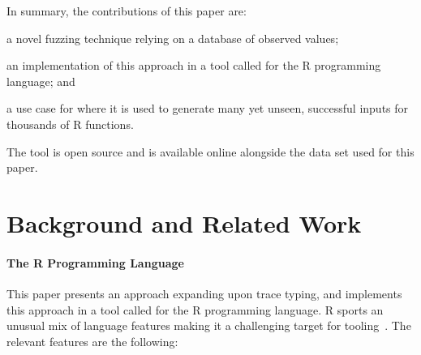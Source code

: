 \documentclass[sigplan,anonymous,review]{acmart}
\begin{document}
In summary, the contributions of this paper are:
%
\begin{inparaenum}[(1)]
    \item a novel fuzzing technique relying on a database of observed values;
    \item an implementation of this approach in a tool called \tool for the R programming language; and
    \item a use case for \tool where it is used to generate many yet unseen, successful inputs for thousands of R functions.
\end{inparaenum} 

The tool is open source and is available online alongside the data set used for this paper.

\section{Background and Related Work}
\label{sec:background}

\paragraph{The R Programming Language}

This paper presents an approach expanding upon trace typing, and implements this approach in a tool called \tool for the R programming language. 
R sports an unusual mix of language features making it a challenging target for
tooling~\cite{morandat2012evaluating}. 
The relevant features are the following:
\end{document}
